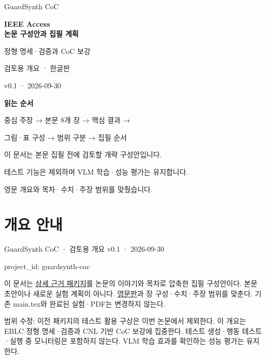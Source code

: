\documentclass[11pt,a4paper]{article}
\begin{document}
\begin{titlepage}
\vspace*{20mm}
{\color{navy}\Large GuardSynth CoC\par}
\vspace{10mm}
{\huge\bfseries IEEE Access\\[4mm]논문 구성안과 집필 계획\par}
\vspace{12mm}
{\Large 정형 명세·검증과 CoC 보강\par}
\vspace{6mm}
검토용 개요 · 한글판\par
v0.1 · 2026-09-30\par
\vspace{12mm}
\textbf{읽는 순서}\par
중심 주장 → 본문 8개 장 → 핵심 결과 →\par
그림·표 구성 → 범위 구분 → 집필 순서\par
\vfill
이 문서는 본문 집필 전에 검토할 개략 구성안입니다.\par
테스트 기능은 제외하며 VLM 학습·성능 평가는 유지합니다.\par
영문 개요와 목차·수치·주장 범위를 맞췄습니다.\par
\end{titlepage}
\tableofcontents
\clearpage
\section*{개요 안내}


GuardSynth CoC · 검토용 개요 v0.1 · 2026-09-30\par

project\_\allowbreak{}id: {\ttfamily\small guardsynth-coc}\par

이 문서는 \href{\detokenize{../../../../../../projects/04-guardsynth-coc/paper/GUARDSYNTH_COC_METHODS_SETTINGS_PACKAGE_V01_KO.md}}{상세 근거 패키지}를 논문의 이야기와 목차로 압축한 집필 구성안이다. 본문 초안이나 새로운 실험 계획이 아니다. \href{\detokenize{../../../../../../projects/04-guardsynth-coc/paper/IEEE_ACCESS_MANUSCRIPT_OUTLINE_V01_EN.md}}{영문판}과 장 구성·수치·주장 범위를 맞춘다. 기존 main.tex와 완료된 실험·PDF는 변경하지 않는다.\par

범위 수정: 이전 패키지의 테스트 활용 구상은 이번 논문에서 제외한다. 이 개요는 EBLC 정형 명세·검증과 CNL 기반 CoC 보강에 집중한다. 테스트 생성·행동 테스트·실행 중 모니터링은 포함하지 않는다. VLM 학습 효과를 확인하는 성능 평가는 유지한다.\par
\end{document}
